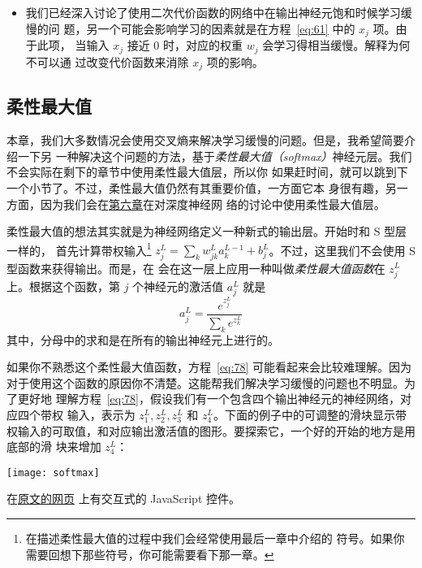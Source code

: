 \begin{itemize}
\item 我们已经深入讨论了使用二次代价函数的网络中在输出神经元饱和时候学习缓慢的问
  题，另一个可能会影响学习的因素就是在方程~\eqref{eq:61} 中的 $x_j$ 项。由于此项，
  当输入 $x_j$ 接近 $0$ 时，对应的权重 $w_j$ 会学习得相当缓慢。解释为何不可以通
  过改变代价函数来消除 $x_j$ 项的影响。
\end{itemize}

\subsection{柔性最大值}
\label{subsec:softmax}

本章，我们大多数情况会使用交叉熵来解决学习缓慢的问题。但是，我希望简要介绍一下另
一种解决这个问题的方法，基于\emph{柔性最大值（softmax）}神经元层。我们不会实际在剩下的章节中使用柔性最大值层，所以你
如果赶时间，就可以跳到下一个小节了。不过，柔性最大值仍然有其重要价值，一方面它本
身很有趣，另一方面，因为我们会在\hyperref[ch:Deeplearning]{第六章}在对深度神经网
络的讨论中使用柔性最大值层。

柔性最大值的想法其实就是为神经网络定义一种新式的输出层。开始时和 S 型层一样的，
首先计算带权输入\footnote{在描述柔性最大值的过程中我们会经常使用最后一章中介绍的
  符号。如果你需要回想下那些符号，你可能需要看下那一章。} $z^L_j = \sum_{k}
w^L_{jk} a^{L-1}_k + b^L_j$。不过，这里我们不会使用 S 型函数来获得输出。而是，在
会在这一层上应用一种叫做\emph{柔性最大值函数}在 $z^L_j$ 上。根据这个函数，第 $j$ 个神经元的激活值 $a^L_j$ 就是
\begin{equation}
  a^L_j = \frac{e^{z^L_j}}{\sum_k e^{z^L_k}}
  \label{eq:78}\tag{78}
\end{equation}
其中，分母中的求和是在所有的输出神经元上进行的。

如果你不熟悉这个柔性最大值函数，方程~\eqref{eq:78} 可能看起来会比较难理解。因为
对于使用这个函数的原因你不清楚。这能帮我们解决学习缓慢的问题也不明显。为了更好地
理解方程~\eqref{eq:78}，假设我们有一个包含四个输出神经元的神经网络，对应四个带权
输入，表示为 $z^L_1, z^L_2, z^L_3$ 和 $z^L_4$。下面的例子中的可调整的滑块显示带
权输入的可取值，和对应输出激活值的图形。要探索它，一个好的开始的地方是用底部的滑
块来增加 $z^L_4$：

\begin{center}
  \texttt{[image: softmax]}
\end{center}

在\href{http://neuralnetworksanddeeplearning.com/chap3.html#softmax}{原文的网页}%
上有交互式的 JavaScript 控件。

